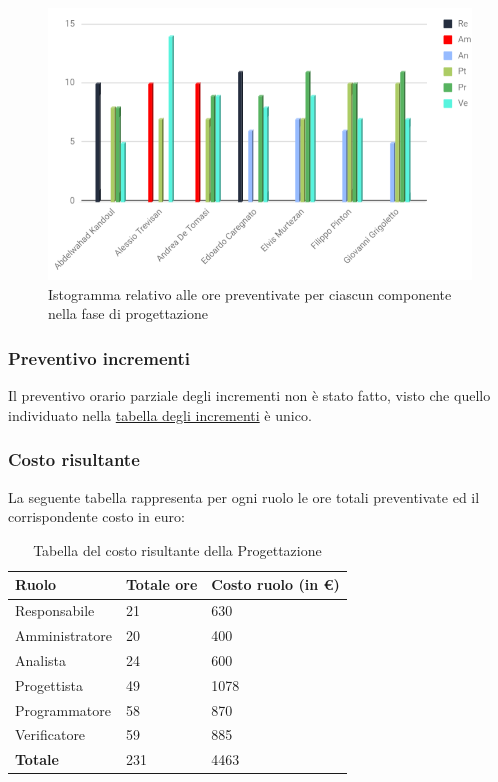 \begin{figure}[h!]
    \centering
	\caption{Istogramma relativo alle ore preventivate per ciascun componente nella fase di progettazione}
    \includegraphics[scale=0.60]{./src/Preventivo/src/img/IstoProj.png}  
\end{figure}
\subsubsection{Preventivo incrementi}
Il preventivo orario parziale degli incrementi non è stato fatto, visto che quello individuato nella \hyperlink{TabellaIncrementi}{tabella degli incrementi} è unico.

\subsubsection{Costo risultante}
La seguente tabella rappresenta per ogni ruolo le ore totali preventivate ed il corrispondente costo in euro:
{
\renewcommand{\arraystretch}{2}
\begin{longtable}{ C{3cm} C{2cm} C{4cm}}
\caption{Tabella del costo risultante della Progettazione}\\
\rowcolor{\primaryColor}

\textcolor{\secondaryColor}{\textbf{Ruolo}} & 
\textcolor{\secondaryColor}{\textbf{Totale ore}} & 
\textcolor{\secondaryColor}{\textbf{Costo ruolo (in \euro{})}}\\	
\endhead
        
Responsabile    &  21 &  630 \\
Amministratore  &  20 &  400 \\
Analista        &  24 &  600 \\
Progettista     &  49 &  1078 \\
Programmatore   &  58 &  870 \\
Verificatore    &  59 &  885 \\
\textbf{Totale} &  231 & 4463 \\	
        	
\end{longtable}
}

